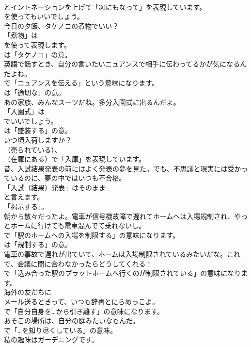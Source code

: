 \documentclass[8pt]{extreport}
\begin{document}
\begin{CJK}{UTF8}{min}
\\	とイントネーションを上げて「30にもなって」を表現しています。
\\	を使ってもいいでしょう。	
\\	今日の夕飯、タケノコの煮物でいい？ 
\\	「煮物」は 
\\	を使って表現します。
\\	は「タケノコ」の意。	
\\	英語で話すとき、自分の言いたいニュアンスで相手に伝わってるかが気になるんだよね。 
\\	で「ニュアンスを伝える」という意味になります。
\\	は「適切な」の意。	
\\	あの家族、みんなスーツだね。多分入園式に出るんだよ。 
\\	「入園式」は
\\	でいいでしょう。
\\	は「盛装する」の意。	
\\	いつ頃入荷しますか？ 
\\	（売られている）、
\\	（在庫にある）で「入庫」を表現しています。	
\\	昔、入試結果発表の前にはよく発表の夢を見た。でも、不思議と現実には受かっているのに、夢の中ではいつも不合格。 
\\	「入試（結果）発表」はそのまま
\\	と言えます。
\\	「掲示する」。	
\\	朝から散々だったよ。電車が信号機故障で遅れてホームへは入場規制され、やっとホームに行けても電車混んでて乗れないし。 
\\	で「駅のホームへの入場を制限する」の意味になります。
\\	は「規制する」の意。	
\\	電車の事故で遅れが出ていて、ホームは入場制限されているみたいだな。これで、会議に間に合わなかったらどうしてくれる！ 
\\	で「込み合った駅のプラットホームへ行くのが制限されている」の意味になります。	
\\	海外の友だちに
\\	メール送るときって、いつも辞書とにらめっこよ。 
\\	で「自分自身を…から引き離す」の意味になります。	
\\	あそこの場所は、自分の庭みたいなもんだ。 
\\	で「…を知り尽くしている」の意味。	
\\	私の趣味はガーデニングです。 

\end{CJK}
\end{document}
